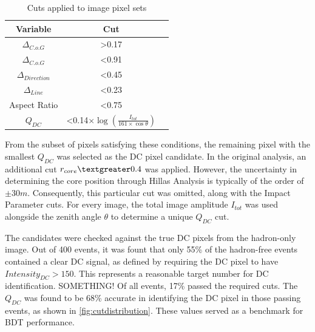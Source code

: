 \documentclass[]{article}
\begin{document}
\begin{table}[h!]
  \centering
  \caption{Cuts applied to image pixel sets}
  \label{tab:table1}
  \begin{tabular}{ccc}
    \toprule
    Variable & Cut\\
    \midrule
     $ \Delta_{C.o.G}$ & \textgreater 0.17 \\
     $ \Delta_{C.o.G}$ & \textless 0.91 \\
     $\Delta_{Direction}$ & \textless 0.45 \\
     $\Delta_{Line}$ & \textless 0.23 \\
     Aspect Ratio & \textless 0.75 \\
     $Q_{DC}$ & \textless 0.14$ \times \log(\frac{I_{tot}}{161 \times \cos \theta})$ \\
    \bottomrule
  \end{tabular}
\end{table}

From the subset of pixels satisfying these conditions, the remaining pixel with the smallest $Q_{DC}$ was selected as the DC pixel candidate. In the original analysis, an additional cut $r_{core} \textgreater 0.4$ was applied. However, the uncertainty in determining the core position through Hillas Analysis is typically of the order of $\pm 30m$. Consequently, this particular cut was omitted, along with the Impact Parameter cuts. For every image, the total image amplitude $I_{tot}$ was used alongside the zenith angle $\theta$ to determine a unique $Q_{DC}$ cut. 

The candidates were checked against the true DC pixels from the hadron-only image. Out of 400 events, it was fount that only 55\% of the hadron-free events contained a clear DC signal, as defined by requiring the DC pixel to have $Intensity_{DC} > 150$. This represents a reasonable target number for DC identification. SOMETHING! Of all events, 17\% passed the required cuts. The $Q_{DC}$ was found to be 68\% accurate in identifying the DC pixel in those passing events, as shown in \ref{fig:cutdistribution}. These values served as a benchmark for BDT performance.
\end{document}
